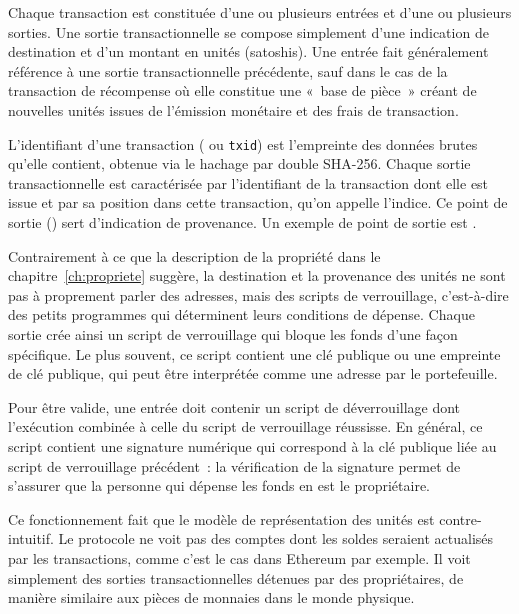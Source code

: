 Chaque transaction est constituée d'une ou plusieurs entrées et d'une ou plusieurs sorties. Une sortie transactionnelle se compose simplement d'une indication de destination et d'un montant en unités (satoshis). Une entrée fait généralement référence à une sortie transactionnelle précédente, sauf dans le cas de la transaction de récompense où elle constitue une «~base de pièce~» créant de nouvelles unités issues de l'émission monétaire et des frais de transaction. %

L'identifiant d'une transaction ( ou \texttt{txid}) est l'empreinte des données brutes qu'elle contient, obtenue via le hachage par double SHA-256. Chaque sortie transactionnelle est caractérisée par l'identifiant de la transaction dont elle est issue et par sa position dans cette transaction, qu'on appelle l'indice. Ce point de sortie () sert d'indication de provenance. Un exemple de point de sortie est \texttt{}.

Contrairement à ce que la description de la propriété dans le chapitre~\ref{ch:propriete} suggère, la destination et la provenance des unités ne sont pas à proprement parler des adresses, mais des scripts de verrouillage, c'est-à-dire des petits programmes qui déterminent leurs conditions de dépense. Chaque sortie crée ainsi un script de verrouillage qui bloque les fonds d'une façon spécifique. Le plus souvent, ce script contient une clé publique ou une empreinte de clé publique, qui peut être interprétée comme une adresse par le portefeuille.

Pour être valide, une entrée doit contenir un script de déverrouillage dont l'exécution combinée à celle du script de verrouillage réussisse. En général, ce script contient une signature numérique qui correspond à la clé publique liée au script de verrouillage précédent~: la vérification de la signature permet de s'assurer que la personne qui dépense les fonds en est le propriétaire.

Ce fonctionnement fait que le modèle de représentation des unités est contre-intuitif. Le protocole ne voit pas des comptes dont les soldes seraient actualisés par les transactions, comme c'est le cas dans Ethereum par exemple. Il voit simplement des sorties transactionnelles détenues par des propriétaires, de manière similaire aux pièces de monnaies dans le monde physique.

